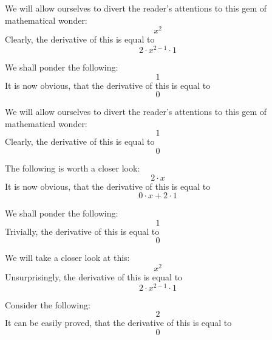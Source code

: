 \documentclass{article}
\begin{document}
We will allow ourselves to divert the reader's attentions to this gem of mathematical wonder:
\begin{equation}
x ^{2 } 
\end{equation}
Clearly, the derivative of this is equal to
\begin{equation}
2 \cdot x ^{2 - 1 } \cdot 1 
\end{equation}

We shall ponder the following:
\begin{equation}
1 
\end{equation}
It is now obvious, that the derivative of this is equal to
\begin{equation}
0 
\end{equation}

We will allow ourselves to divert the reader's attentions to this gem of mathematical wonder:
\begin{equation}
1 
\end{equation}
Clearly, the derivative of this is equal to
\begin{equation}
0 
\end{equation}

The following is worth a closer look:
\begin{equation}
2 \cdot x 
\end{equation}
It is now obvious, that the derivative of this is equal to
\begin{equation}
0 \cdot x + 2 \cdot 1 
\end{equation}

We shall ponder the following:
\begin{equation}
1 
\end{equation}
Trivially, the derivative of this is equal to
\begin{equation}
0 
\end{equation}

We will take a closer look at this:
\begin{equation}
x ^{2 } 
\end{equation}
Unsurprisingly, the derivative of this is equal to
\begin{equation}
2 \cdot x ^{2 - 1 } \cdot 1 
\end{equation}

Consider the following:
\begin{equation}
2 
\end{equation}
It can be easily proved, that the derivative of this is equal to
\begin{equation}
0 
\end{equation}
\end{document}
